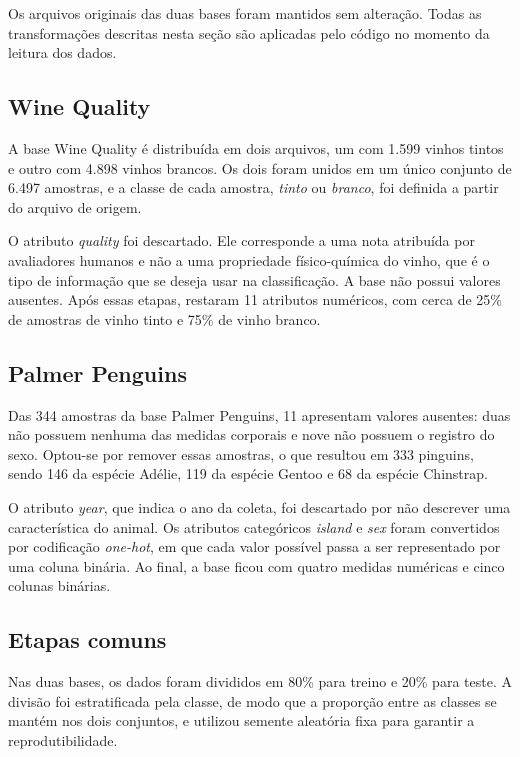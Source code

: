 \documentclass[12pt, oneside, a4paper, english, brazilian]{abntex2}
\begin{document}
Os arquivos originais das duas bases foram mantidos sem alteração. Todas as transformações descritas nesta seção são aplicadas pelo código no momento da leitura dos dados.

\subsection{Wine Quality}

A base Wine Quality é distribuída em dois arquivos, um com 1.599 vinhos tintos e outro com 4.898 vinhos brancos. Os dois foram unidos em um único conjunto de 6.497 amostras, e a classe de cada amostra, \textit{tinto} ou \textit{branco}, foi definida a partir do arquivo de origem.

O atributo \textit{quality} foi descartado. Ele corresponde a uma nota atribuída por avaliadores humanos e não a uma propriedade físico-química do vinho, que é o tipo de informação que se deseja usar na classificação. A base não possui valores ausentes. Após essas etapas, restaram 11 atributos numéricos, com cerca de 25\% de amostras de vinho tinto e 75\% de vinho branco.

\subsection{Palmer Penguins}

Das 344 amostras da base Palmer Penguins, 11 apresentam valores ausentes: duas não possuem nenhuma das medidas corporais e nove não possuem o registro do sexo. Optou-se por remover essas amostras, o que resultou em 333 pinguins, sendo 146 da espécie Adélie, 119 da espécie Gentoo e 68 da espécie Chinstrap.

O atributo \textit{year}, que indica o ano da coleta, foi descartado por não descrever uma característica do animal. Os atributos categóricos \textit{island} e \textit{sex} foram convertidos por codificação \textit{one-hot}, em que cada valor possível passa a ser representado por uma coluna binária. Ao final, a base ficou com quatro medidas numéricas e cinco colunas binárias.

\subsection{Etapas comuns}

Nas duas bases, os dados foram divididos em 80\% para treino e 20\% para teste. A divisão foi estratificada pela classe, de modo que a proporção entre as classes se mantém nos dois conjuntos, e utilizou semente aleatória fixa para garantir a reprodutibilidade.
\end{document}

